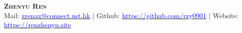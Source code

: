 \documentclass[letterpaper,10pt]{article}
\begin{document}

\begin{center}
    \textbf{\Huge \scshape {Zhenyu Ren}} \\ \vspace{3pt}
    \small
    \faAt \hspace{.5pt} Mail: \href{mailto:zrenax@connect.ust.hk}{\textcolor{blue}{zrenax@connect.ust.hk}}
    $|$
    \faGithub \hspace{.5pt} Github: \href{https://github.com/rzy0901}{\textcolor{blue}{https://github.com/rzy0901}}
    $|$
    \faGlobe \hspace{.5pt} Website: \href{https://renzhenyu.site}{\textcolor{blue}{https://renzhenyu.site}}
\end{center}



\end{document}
